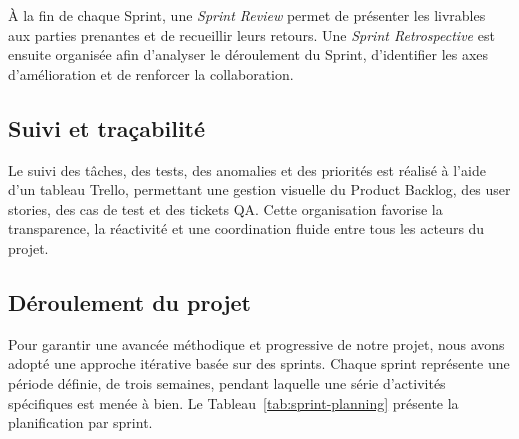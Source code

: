 \documentclass[12pt,a4paper]{article}
\begin{document}
{    À la fin de chaque Sprint, une \textit{Sprint Review} permet de présenter les livrables aux parties prenantes et de recueillir leurs retours. Une \textit{Sprint Retrospective} est ensuite organisée afin d'analyser le déroulement du Sprint, d'identifier les axes d'amélioration et de renforcer la collaboration.

    \subsection{Suivi et traçabilité}
    Le suivi des tâches, des tests, des anomalies et des priorités est réalisé à l'aide d'un tableau Trello, permettant une gestion visuelle du Product Backlog, des user stories, des cas de test et des tickets QA. Cette organisation favorise la transparence, la réactivité et une coordination fluide entre tous les acteurs du projet.

    \subsection{Déroulement du projet}
    Pour garantir une avancée méthodique et progressive de notre projet, nous avons adopté une approche itérative basée sur des sprints. Chaque sprint représente une période définie, de trois semaines, pendant laquelle une série d'activités spécifiques est menée à bien. Le Tableau~\ref{tab:sprint-planning} présente la planification par sprint.

}
\end{document}
